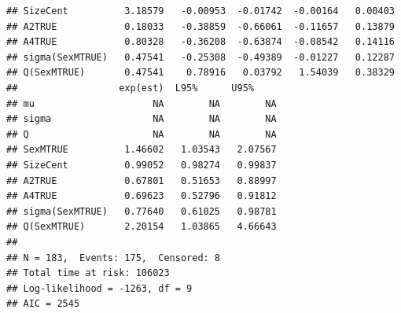\documentclass{article}\usepackage[]{graphicx}\usepackage[]{color}
\makeatletter
\newenvironment{kframe}{%
 \def\at@end@of@kframe{}%
 \ifinner\ifhmode%
  \def\at@end@of@kframe{\end{minipage}}%
  \begin{minipage}{\columnwidth}%
 \fi\fi%
 \def\FrameCommand##1{\hskip\@totalleftmargin \hskip-\fboxsep
 \colorbox{shadecolor}{##1}\hskip-\fboxsep
     \hskip-\linewidth \hskip-\@totalleftmargin \hskip\columnwidth}%
 \MakeFramed {\advance\hsize-\width
   \@totalleftmargin\z@ \linewidth\hsize
   \@setminipage}}%
 {\par\unskip\endMakeFramed%
 \at@end@of@kframe}
\newenvironment{knitrout}{}{} %
\makeatother
\begin{document}
\begin{knitrout}
\begin{kframe}
\begin{verbatim}
## SizeCent          3.18579   -0.00953  -0.01742  -0.00164   0.00403
## A2TRUE            0.18033   -0.38859  -0.66061  -0.11657   0.13879
## A4TRUE            0.80328   -0.36208  -0.63874  -0.08542   0.14116
## sigma(SexMTRUE)   0.47541   -0.25308  -0.49389  -0.01227   0.12287
## Q(SexMTRUE)       0.47541    0.78916   0.03792   1.54039   0.38329
##                  exp(est)  L95%      U95%    
## mu                     NA        NA        NA
## sigma                  NA        NA        NA
## Q                      NA        NA        NA
## SexMTRUE          1.46602   1.03543   2.07567
## SizeCent          0.99052   0.98274   0.99837
## A2TRUE            0.67801   0.51653   0.88997
## A4TRUE            0.69623   0.52796   0.91812
## sigma(SexMTRUE)   0.77640   0.61025   0.98781
## Q(SexMTRUE)       2.20154   1.03865   4.66643
## 
## N = 183,  Events: 175,  Censored: 8
## Total time at risk: 106023
## Log-likelihood = -1263, df = 9
## AIC = 2545
\end{verbatim}
\end{kframe}
\end{knitrout}
\end{document}
